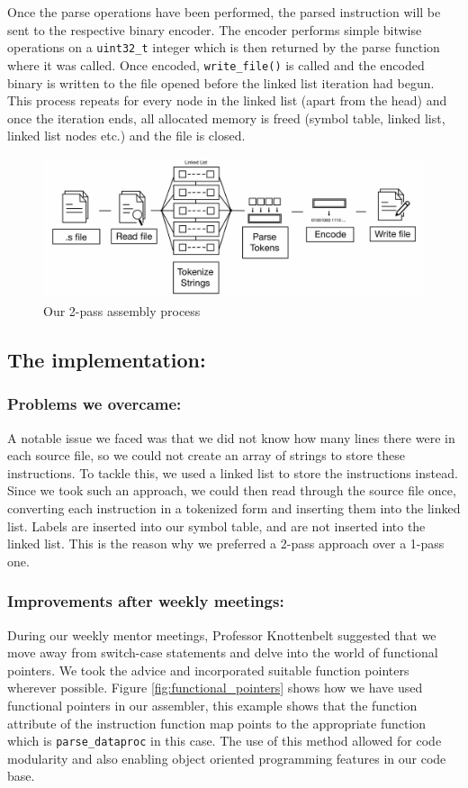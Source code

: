 \documentclass[a4paper]{article}
\begin{document}
Once the parse operations have been performed, the parsed instruction will be sent to the respective binary encoder. The encoder performs simple bitwise operations on a \verb|uint32_t| integer which is then returned by the parse function where it was called. Once encoded, \verb|write_file()| is called and the encoded binary is written to the file opened before the linked list iteration had begun. This process repeats for every node in the linked list (apart from the head) and once the iteration ends, all allocated memory is freed (symbol table, linked list, linked list nodes etc.) and the file is closed.

\begin{figure}[htp]
    \centering
    \includegraphics[width=15cm, frame]{assembler_flow.jpg}
    \caption{Our 2-pass assembly process}
    \label{fig:assembler}
\end{figure}

\subsection{The implementation:}\label{Assembler implementation}
\subsubsection{Problems we overcame: }
A notable issue we faced was that we did not know how many lines there were in each source file, so we could not create an array of strings to store these instructions. To tackle this, we used a linked list to store the instructions instead. Since we took such an approach, we could then read through the source file once, converting each instruction in a tokenized form and inserting them into the linked list. Labels are inserted into our symbol table, and are not inserted into the linked list. This is the reason why we preferred a 2-pass approach over a 1-pass one.

\subsubsection{Improvements after weekly meetings: }
During our weekly mentor meetings, Professor Knottenbelt suggested that we move away from switch-case statements and delve into the world of functional pointers. We took the advice and incorporated suitable function pointers wherever possible. Figure \ref{fig:functional_pointers} shows how we have used functional pointers in our assembler, this example shows that the function attribute of the instruction function map points to the appropriate function which is \verb|parse_dataproc| in this case. The use of this method allowed for code modularity and also enabling object oriented programming features in our code base.
\end{document}
